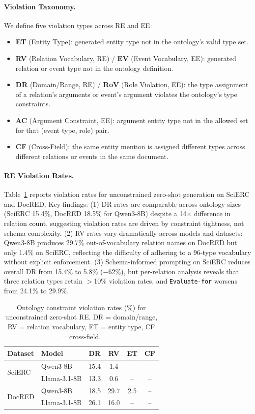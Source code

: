 \documentclass[11pt,a4paper]{article}
\begin{document}
\paragraph{Violation Taxonomy.}
We define five violation types across RE and EE:
\begin{itemize}[nosep]
\item \textbf{ET} (Entity Type): generated entity type not in the ontology's valid type set.
\item \textbf{RV} (Relation Vocabulary, RE) / \textbf{EV} (Event Vocabulary, EE): generated relation or event type not in the ontology definition.
\item \textbf{DR} (Domain/Range, RE) / \textbf{RoV} (Role Violation, EE): the type assignment of a relation's arguments or event's argument violates the ontology's type constraints.
\item \textbf{AC} (Argument Constraint, EE): argument entity type not in the allowed set for that (event type, role) pair.
\item \textbf{CF} (Cross-Field): the same entity mention is assigned different types across different relations or events in the same document.
\end{itemize}

\paragraph{RE Violation Rates.}
Table~\ref{tab:re_violations} reports violation rates for unconstrained zero-shot generation on SciERC and DocRED. Key findings: (1) DR rates are comparable across ontology sizes (SciERC 15.4\%, DocRED 18.5\% for Qwen3-8B) despite a 14$\times$ difference in relation count, suggesting violation rates are driven by constraint tightness, not schema complexity. (2) RV rates vary dramatically across models and datasets: Qwen3-8B produces 29.7\% out-of-vocabulary relation names on DocRED but only 1.4\% on SciERC, reflecting the difficulty of adhering to a 96-type vocabulary without explicit enforcement. (3) Schema-informed prompting on SciERC reduces overall DR from 15.4\% to 5.8\% ($-$62\%), but per-relation analysis reveals that three relation types retain $>$10\% violation rates, and \texttt{Evaluate-for} worsens from 24.1\% to 29.9\%.

\begin{table}[t]
\centering
\small
\caption{Ontology constraint violation rates (\%) for unconstrained zero-shot RE. DR = domain/range, RV = relation vocabulary, ET = entity type, CF = cross-field.}
\label{tab:re_violations}
\begin{tabular}{llcccc}
\toprule
Dataset & Model & DR & RV & ET & CF \\
\midrule
\multirow{2}{*}{SciERC} & Qwen3-8B & 15.4 & 1.4 & -- & -- \\
& Llama-3.1-8B & 13.3 & 0.6 & -- & -- \\
\midrule
\multirow{2}{*}{DocRED} & Qwen3-8B & 18.5 & 29.7 & 2.5 & -- \\
& Llama-3.1-8B & 26.1 & 16.0 & -- & -- \\
\bottomrule
\end{tabular}
\end{table}
\end{document}
